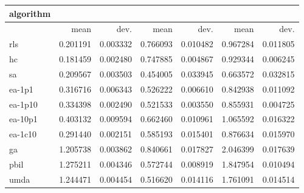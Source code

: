 \begin{tabular}{@{}l*{6}{>{{}}N{1}{2}}@{}}
\toprule
{algorithm} &  &  &  \\
\midrule
& {mean} & {dev.} & {mean} & {dev.} & {mean} & {dev.} \\
\midrule
rls & 0.201191 & 0.003332 & 0.766093 & 0.010482 & 0.967284 & 0.011805 \\
 hc & 0.181459 & 0.002480 & 0.747885 & 0.004867 & 0.929344 & 0.006245 \\
 sa & 0.209567 & 0.003503 & 0.454005 & 0.033945 & 0.663572 & 0.032815 \\
 ea-1p1 & 0.316716 & 0.006343 & 0.526222 & 0.006610 & 0.842938 & 0.011092 \\
 ea-1p10 & 0.334398 & 0.002490 & 0.521533 & 0.003550 & 0.855931 & 0.004725 \\
 ea-10p1 & 0.403132 & 0.009594 & 0.662460 & 0.010961 & 1.065592 & 0.016322 \\
 ea-1c10 & 0.291440 & 0.002151 & 0.585193 & 0.015401 & 0.876634 & 0.015970 \\
 ga & 1.205738 & 0.003862 & 0.840661 & 0.017827 & 2.046399 & 0.017639 \\
 pbil & 1.275211 & 0.004346 & 0.572744 & 0.008919 & 1.847954 & 0.010494 \\
 umda & 1.244471 & 0.004454 & 0.516620 & 0.014116 & 1.761091 & 0.014514 \\
 \bottomrule
\end{tabular}
